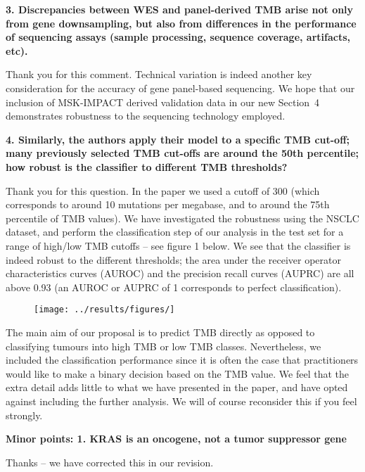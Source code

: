 \documentclass[12pt]{article}
\begin{document}
\textbf{3. Discrepancies between WES and panel-derived TMB arise not only from gene downsampling, but also from differences in the performance of sequencing assays (sample processing, sequence coverage, artifacts, etc).}

Thank you for this comment. Technical variation is indeed another key consideration for the accuracy of gene panel-based sequencing. We hope that our inclusion of MSK-IMPACT derived validation data in our new Section~4 demonstrates robustness to the sequencing technology employed. 

\textbf{4. Similarly, the authors apply their model to a specific TMB cut-off; many previously selected TMB cut-offs are around the 50th percentile; how robust is the classifier to different TMB thresholds?}

Thank you for this question.   In the paper we used a cutoff of 300 (which corresponds to around 10 mutations per megabase, and to around the 75th percentile of TMB values).  We have investigated the robustness using the NSCLC dataset, and perform the classification step of our analysis in the test set for a range of high/low TMB cutoffs -- see figure 1 below. We see that the classifier is indeed robust to the different thresholds; the area under the receiver operator characteristics curves (AUROC) and the precision recall curves (AUPRC) are all above 0.93 (an AUROC or AUPRC of 1 corresponds to perfect classification). 

\begin{figure}[htbp]
\centering
\texttt{[image: ../results/figures/]}
\caption{}
\end{figure} 


The main aim of our proposal is to predict TMB directly as opposed to classifying tumours into high TMB or low TMB classes. Nevertheless, we included the classification performance since it is often the case that practitioners would like to make a binary decision based on the TMB value. We feel that the extra detail adds little to what we have presented in the paper, and have opted against including the further analysis.  We will of course reconsider this if you feel strongly.  

\textbf{Minor points: 1. KRAS is an oncogene, not a tumor suppressor gene}

Thanks -- we have corrected this in our revision. 

\begin{thebibliography}{75}

\end{thebibliography}
\end{document}
